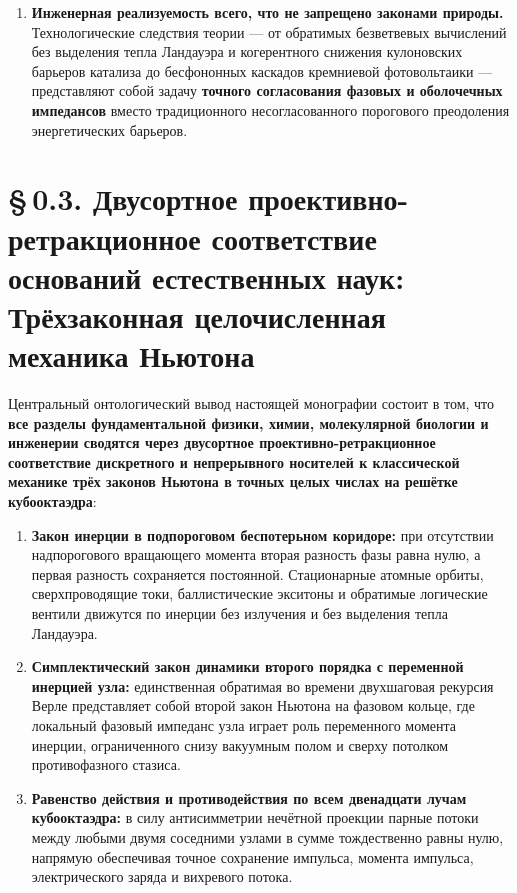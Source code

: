 \begin{enumerate}[leftmargin=*]
\item \textbf{Инженерная реализуемость всего, что не запрещено законами природы.}
  Технологические следствия теории --- от обратимых безветвевых вычислений без выделения тепла Ландауэра и когерентного снижения кулоновских барьеров катализа до бесфононных каскадов кремниевой фотовольтаики --- представляют собой задачу \textbf{точного согласования фазовых и оболочечных импедансов} вместо традиционного несогласованного порогового преодоления энергетических барьеров.
\end{enumerate}

\section*{§\,0.3. Двусортное проективно-ретракционное соответствие оснований естественных наук: Трёхзаконная целочисленная механика Ньютона}

Центральный онтологический вывод настоящей монографии состоит в том, что \textbf{все разделы фундаментальной физики, химии, молекулярной биологии и инженерии сводятся через двусортное проективно-ретракционное соответствие дискретного и непрерывного носителей к классической механике трёх законов Ньютона в точных целых числах на решётке кубооктаэдра}:
\begin{enumerate}[label=\textbf{Закон Ньютона \Roman*.},leftmargin=*,noitemsep]
\item \textbf{Закон инерции в подпороговом беспотерьном коридоре:}
  при отсутствии надпорогового вращающего момента вторая разность фазы равна нулю, а первая разность сохраняется постоянной. Стационарные атомные орбиты, сверхпроводящие токи, баллистические экситоны и обратимые логические вентили движутся по инерции без излучения и без выделения тепла Ландауэра.
\item \textbf{Симплектический закон динамики второго порядка с переменной инерцией узла:}
  единственная обратимая во времени двухшаговая рекурсия Верле представляет собой второй закон Ньютона на фазовом кольце, где локальный фазовый импеданс узла играет роль переменного момента инерции, ограниченного снизу вакуумным полом и сверху потолком противофазного стазиса.
\item \textbf{Равенство действия и противодействия по всем двенадцати лучам кубооктаэдра:}
  в силу антисимметрии нечётной проекции парные потоки между любыми двумя соседними узлами в сумме тождественно равны нулю, напрямую обеспечивая точное сохранение импульса, момента импульса, электрического заряда и вихревого потока.
\end{enumerate}

